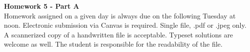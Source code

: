 \documentclass{article}
\begin{document}


{\bf Homework 5 - Part A}\\
Homework assigned on a given day is always due on the following Tuesday at noon. Electronic submission via Canvas is required. Single file, .pdf or .jpeg only.  A scannerized copy of a handwritten file is acceptable. Typeset solutions are welcome as well. The student is responsible for the readability of the file. 
\end{document}
